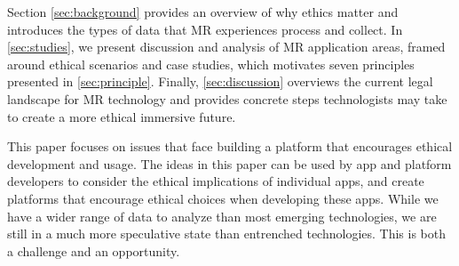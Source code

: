 Section \ref{sec:background} provides an overview of why ethics matter and introduces the types of data that MR experiences process and collect. In \autoref{sec:studies}, we present discussion and analysis of MR application areas, framed around ethical scenarios and case studies, which motivates seven principles presented in \autoref{sec:principle}. Finally, \autoref{sec:discussion} overviews the current legal landscape for MR technology and provides concrete steps technologists may take to create a more ethical immersive future.

This paper focuses on issues that face building a platform that encourages ethical development and usage. The ideas in this paper can be used by app and platform developers to consider the ethical implications of individual apps, and create platforms that encourage ethical choices when developing these apps. While we have a wider range of data to analyze than most emerging technologies, we are still in a much more speculative state than entrenched technologies. This is both a challenge and an opportunity.


